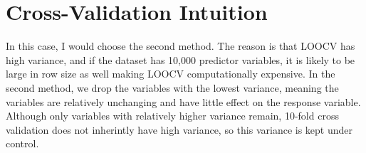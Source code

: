 \documentclass[12pt]{article}
\begin{document}
\section{Cross-Validation Intuition}
In this case, I would choose the second method. The reason is that LOOCV has high variance, and if the dataset has 10,000 predictor variables, it is likely to be large in row size as well making LOOCV computationally expensive. In the second method, we drop the variables with the lowest variance, meaning 
the variables are relatively unchanging and have little effect on the response variable. Although only variables with relatively higher variance remain, 10-fold cross validation does not inherintly have high variance, so this variance is kept under control.  
\end{document}
